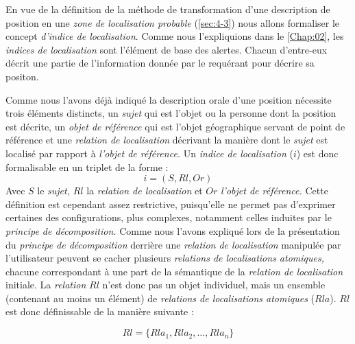 En vue de la définition de la méthode de transformation d'une
description de position en une \emph{zone de localisation probable}
(\autoref{sec:4-3}) nous allons formaliser le concept \emph{d'indice
  de localisation}. Comme nous l'expliquions dans le
\autoref{Chap:02}, les \emph{indices de localisation} sont l'élément
de base des alertes. Chacun d'entre-eux décrit une partie de
l'information donnée par le requérant pour décrire sa positon.

Comme nous l'avons déjà indiqué la description orale d'une position
nécessite trois éléments distincts, un \emph{sujet} qui est l'objet ou
la personne dont la position est décrite, un \emph{objet de référence}
qui est l'objet géographique servant de point de référence et une
\emph{relation de localisation} décrivant la manière dont le
\emph{sujet} est localisé par rapport à \emph{l'objet de référence.}
Un \emph{indice de localisation} (\(i\)) est donc formalisable en un
triplet de la forme :
%
\begin{equation}
  i = (S, Rl, Or)
\end{equation}
%
Avec \(S\) le \emph{sujet,} \(Rl\) la \emph{relation de localisation}
et \(Or\) \emph{l'objet de référence.} Cette définition est cependant
assez restrictive, puisqu'elle ne permet pas d'exprimer certaines des
configurations, plus complexes, notamment celles induites par le
\emph{principe de décomposition.}  Comme nous l'avons expliqué lors de
la présentation du \emph{principe de décomposition} derrière une
\emph{relation de localisation} manipulée par l'utilisateur peuvent se
cacher plusieurs \emph{relations de localisations atomiques,} chacune
correspondant à une part de la sémantique de la \emph{relation de
  localisation} initiale. La \emph{relation} \(Rl\) n'est donc pas un
objet individuel, mais un ensemble (contenant au moins un élément) de
\emph{relations de localisations atomiques} (\(Rla\)). \(Rl\) est donc
définissable de la manière suivante :

\begin{equation}
  Rl = \{Rla_1, Rla_2, \ldots, Rla_n\}
\end{equation}

